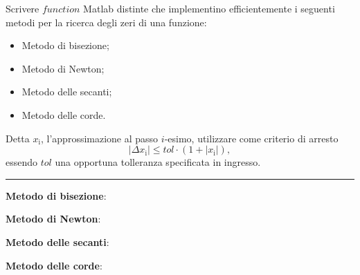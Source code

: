 Scrivere $function$ Matlab distinte che implementino efficientemente 
i seguenti metodi per la ricerca degli zeri di una funzione:
\begin{itemize}
	\item Metodo di bisezione;
	\item Metodo di Newton;
	\item Metodo delle secanti;
	\item Metodo delle corde.
\end{itemize}
Detta $x_\mathrm{i}$, l'approssimazione al passo $i$-esimo, utilizzare come criterio di arresto
$$|\Delta x_\mathrm{i}| \leq tol\cdot(1+|x_\mathrm{i}|),$$
essendo $tol$ una opportuna tolleranza specificata in ingresso.

\hspace{1cm}
\par\noindent\rule{\textwidth}{0.4pt}
\hspace{1cm}

\textbf{Metodo di bisezione}:

\textbf{Metodo di Newton}:

\textbf{Metodo delle secanti}:

\textbf{Metodo delle corde}:

